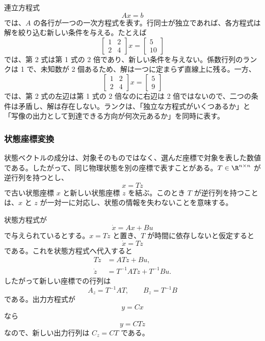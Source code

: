 連立方程式
\begin{equation}
  Ax=b
\end{equation}
では、$A$ の各行が一つの一次方程式を表す。行同士が独立であれば、各方程式は解を絞り込む新しい条件を与える。たとえば
\begin{equation}
  \begin{bmatrix}
    1&2\\
    2&4
  \end{bmatrix}
  x
  =
  \begin{bmatrix}
    5\\
    10
  \end{bmatrix}
\end{equation}
では、第 2 式は第 1 式の 2 倍であり、新しい条件を与えない。係数行列のランクは 1 で、未知数が 2 個あるため、解は一つに定まらず直線上に残る。一方、
\begin{equation}
  \begin{bmatrix}
    1&2\\
    2&4
  \end{bmatrix}
  x
  =
  \begin{bmatrix}
    5\\
    9
  \end{bmatrix}
\end{equation}
では、第 2 式の左辺は第 1 式の 2 倍なのに右辺は 2 倍ではないので、二つの条件は矛盾し、解は存在しない。ランクは、「独立な方程式がいくつあるか」と「写像の出力として到達できる方向が何次元あるか」を同時に表す。

\subsubsection{状態座標変換}

状態ベクトルの成分は、対象そのものではなく、選んだ座標で対象を表した数値である。したがって、同じ物理状態を別の座標で表すことがある。$T\in\R^{n\times n}$ が逆行列を持つとし、
\begin{equation}
  x=Tz
\end{equation}
で古い状態座標 $x$ と新しい状態座標 $z$ を結ぶ。このとき $T$ が逆行列を持つことは、$x$ と $z$ が一対一に対応し、状態の情報を失わないことを意味する。

状態方程式が
\begin{equation}
  \dot{x}=Ax+Bu
\end{equation}
で与えられているとする。$x=Tz$ と置き、$T$ が時間に依存しないと仮定すると
\begin{equation}
  \dot{x}=T\dot{z}
\end{equation}
である。これを状態方程式へ代入すると
\begin{align}
  T\dot{z}&=ATz+Bu,\\
  \dot{z}&=T^{-1}ATz+T^{-1}Bu.
\end{align}
したがって新しい座標での行列は
\begin{equation}
  A_z=T^{-1}AT,\qquad B_z=T^{-1}B
\end{equation}
である。出力方程式が
\begin{equation}
  y=Cx
\end{equation}
なら
\begin{equation}
  y=CTz
\end{equation}
なので、新しい出力行列は $C_z=CT$ である。

